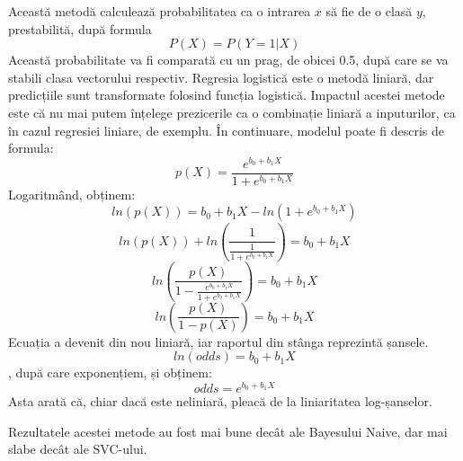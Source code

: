 Această metodă calculează probabilitatea ca o intrarea \(x\) să fie de o clasă \(y\), prestabilită, după formula 
\[P(X) = P(Y=1|X)\]
Această probabilitate va fi comparată cu un prag, de obicei 0.5, după care se va stabili clasa vectorului respectiv.
Regresia logistică este o metodă liniară, dar predicțiile sunt transformate folosind funcția logistică. Impactul acestei metode 
este că nu mai putem înțelege prezicerile ca o combinație liniară a inputurilor, ca în cazul regresiei liniare, de exemplu. În continuare,
modelul poate fi descris de formula:
\[p(X) = \frac{e^{b_0 + b_1 X}}{1 + e^{b_0 + b_1 X}}\]
Logaritmând, obținem:
\[ln(p(X)) = b_0 + b_1 X - ln(1 + e^{b_0 + b_1 X})\]
\[ln(p(X)) + ln(\frac{1}{\frac{1}{1 + e^{b_0 + b_1 X}}}) = b_0 + b_1 X\]
\[ln(\frac{p(X)}{1 - \frac{e^{b_0 + b_1 X}}{1 + e^{b_0 + b_1 X}}}) = b_0 + b_1 X\]
\[ln(\frac{p(X)}{1 - p(X)}) = b_0 + b_1 X\]
Ecuația a devenit din nou liniară, iar raportul din stânga reprezintă șansele.
\[ln(odds) = b_0 + b_1 X\], după care exponențiem, și obținem:
\[odds = e^{b_0 + b_1X}\]
Asta arată că, chiar dacă este neliniară, pleacă de la liniaritatea log-șanselor.


Rezultatele acestei metode au fost mai bune decât ale Bayesului Naive, dar mai slabe decât ale SVC-ului.




